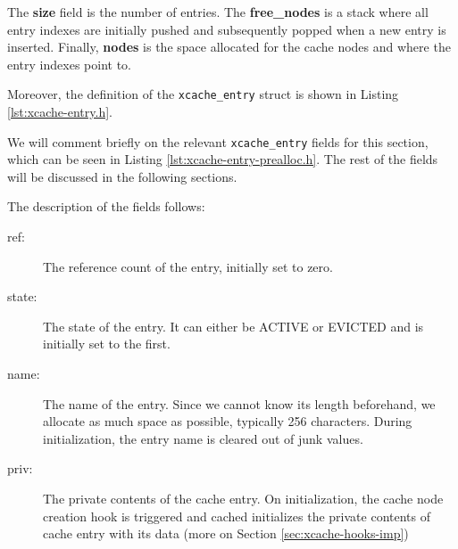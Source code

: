 
The \textbf{size} field is the number of entries. The \textbf{free\_nodes} is a 
stack where all entry indexes are initially pushed and subsequently popped when 
a new entry is inserted. Finally, \textbf{nodes} is the space allocated for the 
cache nodes and where the entry indexes point to.

Moreover, the definition of the \texttt{xcache\_entry} struct is shown in 
Listing \ref{lst:xcache-entry.h}.


We will comment briefly on the relevant \texttt{xcache\_entry} fields for this 
section, which can be seen in Listing \ref{lst:xcache-entry-prealloc.h}. The 
rest of the fields will be discussed in the following sections.


The description of the fields follows:

\begin{description}
	\item[ref:] The reference count of the entry, initially set to zero.
	\item[state:] The state of the entry. It can either be ACTIVE or 
		EVICTED and is initially set to the first.
	\item[name:] The name of the entry. Since we cannot know its length 
		beforehand, we allocate as much space as possible, typically 
		256 characters. During initialization, the entry name is 
		cleared out of junk values.
	\item[priv:] The private contents of the cache entry. On 
		initialization, the cache node creation hook is triggered and 
		cached initializes the private contents of cache entry with its 
		data (more on Section \ref{sec:xcache-hooks-imp})
\end{description}

